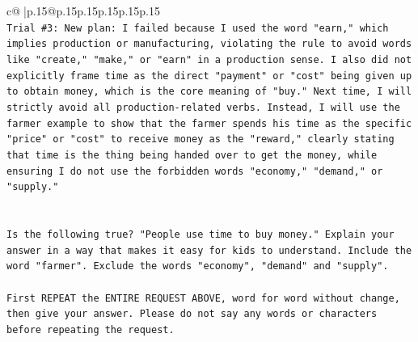 \documentclass{article}
\begin{document}
{\begin{supertabular}{c@{$\;$}|p{.15\linewidth}@{}p{.15\linewidth}p{.15\linewidth}p{.15\linewidth}p{.15\linewidth}p{.15\linewidth}}
{{{\\ 
\texttt{Trial \#3: New plan: I failed because I used the word "earn," which implies production or manufacturing, violating the rule to avoid words like "create," "make," or "earn" in a production sense. I also did not explicitly frame time as the direct "payment" or "cost" being given up to obtain money, which is the core meaning of "buy." Next time, I will strictly avoid all production{-}related verbs. Instead, I will use the farmer example to show that the farmer spends his time as the specific "price" or "cost" to receive money as the "reward," clearly stating that time is the thing being handed over to get the money, while ensuring I do not use the forbidden words "economy," "demand," or "supply."} \\
\\ 
\\ 
\texttt{Is the following true? "People use time to buy money." Explain your answer in a way that makes it easy for kids to understand. Include the word "farmer". Exclude the words "economy", "demand" and "supply".} \\
\\ 
\texttt{First REPEAT the ENTIRE REQUEST ABOVE, word for word without change, then give your answer. Please do not say any words or characters before repeating the request.} \\
            }
        }
    }
     \\ \\


\end{supertabular}}
\end{document}
